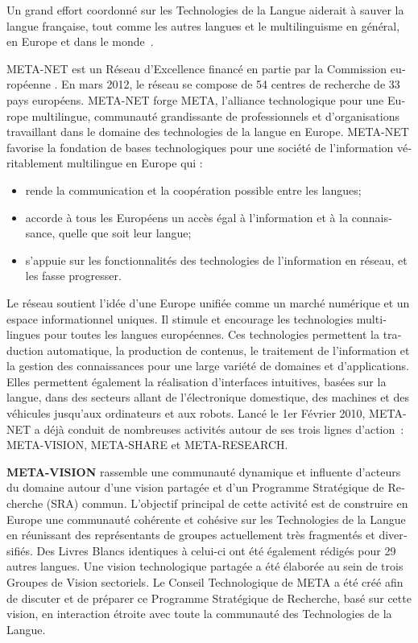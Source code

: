 \begin{french}
\begin{multicols}{2}
Un grand effort coordonné sur les Technologies de la Langue aiderait à
sauver la langue française, tout comme les autres langues et le
multilinguisme en général, en Europe et dans le monde~\cite{worldconclusion}.

\end{multicols}

\clearpage


\begin{multicols}{2}
META-NET est un Réseau d'Excellence financé en partie par la Commission européenne \cite{rehm2011}. En mars 2012, le réseau se compose de 54 centres de recherche de 33 pays européens. META-NET forge META, l’alliance technologique pour une Europe multilingue, communauté grandissante de professionnels et d’organisations travaillant dans le domaine des technologies de la langue en Europe. META-NET favorise la fondation de bases technologiques pour une société de l'information véritablement multilingue en Europe qui :
\begin{itemize}
\item rende la communication et la coopération possible entre les langues; 
\item accorde à tous les Européens un accès égal à l'information et à la connaissance, quelle que soit leur langue; 
\item s'appuie sur les fonctionnalités des technologies de l'information en réseau, et les fasse progresser. 
\end{itemize}
Le réseau soutient l’idée d’une Europe unifiée comme un marché numérique et un espace informationnel uniques. Il stimule et encourage les technologies multilingues pour toutes les langues européennes. Ces technologies permettent la traduction automatique, la production de contenus, le traitement de l'information et la gestion des connaissances pour une large variété de domaines et d’applications. Elles permettent également la réalisation d’interfaces intuitives, basées sur la langue, dans des secteurs allant de l'électronique domestique, des machines et des véhicules jusqu’aux ordinateurs et aux robots. Lancé le 1er Février 2010, META-NET a déjà conduit de nombreuses activités autour de ses trois lignes d'action~: META-VISION, META-SHARE et META-RESEARCH.

\textbf{META-VISION} rassemble une communauté dynamique et influente d’acteurs du domaine autour d'une vision partagée et d’un Programme Stratégique de Recherche (SRA) commun. L'objectif principal de cette activité est de construire en Europe une communauté cohérente et cohésive sur les Technologies de la Langue en réunissant des représentants de groupes actuellement très fragmentés et diversifiés. Des Livres Blancs identiques à celui-ci ont été également rédigés pour 29 autres langues. Une vision technologique partagée a été élaborée au sein de trois Groupes de Vision sectoriels. Le Conseil Technologique de META a été créé afin de discuter et de préparer ce Programme Stratégique de Recherche, basé sur cette vision, en interaction étroite avec toute la communauté des Technologies de la Langue.


\end{multicols}
\end{french}
